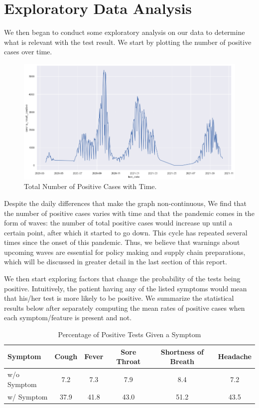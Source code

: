 \documentclass[a4paper, 11pt]{article}
\begin{document}
\section*{Exploratory Data Analysis}
We then began to conduct some exploratory analysis on our data to determine what is relevant with the test result.
We start by plotting the number of positive cases over time. \par
\begin{figure}[H]
\centering
\includegraphics[scale=0.4]{total.png}
\caption{Total Number of Positive Cases with Time.}
\label{Confirmed Cases}
\end{figure}
Despite the daily differences that make the graph non-continuous, We find that the number of positive cases varies with time and that the pandemic comes in the form of waves: the number of total positive cases would increase up until a certain point, after which it started to go down. This cycle has repeated several times since the onset of this pandemic. Thus, we believe that warnings about upcoming waves are essential for policy making and supply chain preparations, which will be discussed in greater detail in the last section of this report. \par
We then start exploring factors that change the probability of the tests being positive. Intuitively, the patient having any of the listed symptoms would mean that his/her test is more likely to be positive. We summarize the statistical results below after separately computing the mean rates of positive cases when each symptom/feature is present and not.\par
\begin{table}[H]
\centering
\caption{Percentage of Positive Tests Given a Symptom}
\begin{tabular}{| l | c | c | c | c | c |}
\hline
Symptom & Cough & Fever & Sore Throat & Shortness of Breath & Headache  \\ \hline
w/o Symptom & 7.2 & 7.3 & 7.9 & 8.4 & 7.2 \\ \hline
w/ Symptom & 37.9 & 41.8 & 43.0 & 51.2 & 43.5 \\
\hline
\end{tabular}
\label{Table}
\end{table}
\end{document}
